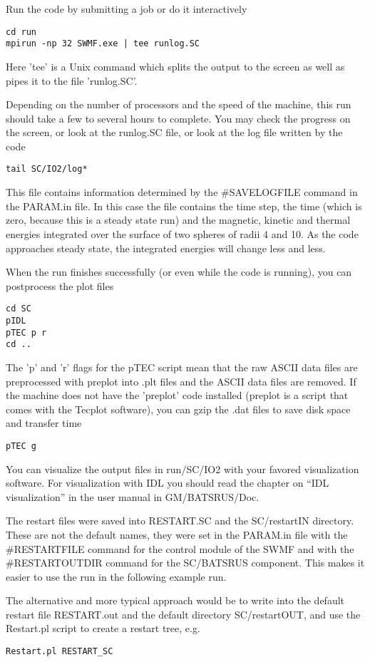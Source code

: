 Run the code by submitting a job or do it interactively
\begin{verbatim}
cd run
mpirun -np 32 SWMF.exe | tee runlog.SC
\end{verbatim}
Here 'tee' is a Unix command which splits the output to the screen as
well as pipes it to the file 'runlog.SC'. 

Depending on the number of processors and the speed of the machine,
this run should take a few to several hours to complete.
You may check the progress on the screen, or look at the 
runlog.SC file, or look at the log file written by the code
\begin{verbatim}
tail SC/IO2/log*
\end{verbatim}
This file contains information determined by the \#SAVELOGFILE command
in the PARAM.in file. In this case the file contains the time step, the
time (which is zero, because this is a steady state run) and the
magnetic, kinetic and thermal energies integrated over the surface of 
two spheres of radii 4 and 10. As the code approaches steady state,
the integrated energies will change less and less. 

When the run finishes successfully (or even while the code is running), 
you can postprocess the plot files
\begin{verbatim}
cd SC
pIDL
pTEC p r
cd ..
\end{verbatim}
The 'p' and 'r' flags for the pTEC script mean that the raw ASCII data
files are preprocessed with preplot into .plt files and the ASCII data
files are removed. If the machine does not have the 'preplot' code
installed (preplot is a script that comes with the Tecplot software),
you can gzip the .dat files to save disk space and transfer time
\begin{verbatim}
pTEC g
\end{verbatim}
You can visualize the output files in run/SC/IO2 with your favored 
visualization software. For visualization with IDL you should read the
chapter on ``IDL visualization'' in the user manual in GM/BATSRUS/Doc.

The restart files were saved into RESTART.SC and the SC/restartIN directory.
These are not the default names, they were set in the PARAM.in file with
the \#RESTARTFILE command for the control module of the SWMF and 
with the \#RESTARTOUTDIR command for the SC/BATSRUS component.
This makes it easier to use the run in the following example run.

The alternative and more typical approach would be to write into the
default restart file RESTART.out and the default directory SC/restartOUT,
and use the Restart.pl script to create a restart tree, e.g.
\begin{verbatim}
Restart.pl RESTART_SC
\end{verbatim}

